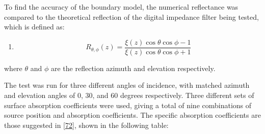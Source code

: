 \documentclass[]{scrreprt}
\providecommand{\tightlist}{%
  \setlength{\itemsep}{0pt}\setlength{\parskip}{0pt}}
\begin{document}
To find the accuracy of the boundary model, the numerical reflectance
was compared to the theoretical reflection of the digital impedance
filter being tested, which is defined as:

\begin{enumerate}
\def\labelenumi{(\arabic{enumi})}
\setcounter{enumi}{47}
\tightlist
\item
  \[R_{\theta, \phi}(z) = \frac{\xi(z)\cos\theta\cos\phi -
  1}{\xi(z)\cos\theta\cos\phi + 1}\]
\end{enumerate}

where \(\theta\) and \(\phi\) are the reflection azimuth and elevation
respectively.

The test was run for three different angles of incidence, with matched
azimuth and elevation angles of 0, 30, and 60 degrees respectively.
Three different sets of surface absorption coefficients were used,
giving a total of nine combinations of source position and absorption
coefficients. The specific absorption coefficients are those suggested
in
{[}\protect\hyperlink{ref-oxnardux5ffrequency-dependentux5f2015}{72}{]},
shown in the following table:
\end{document}
